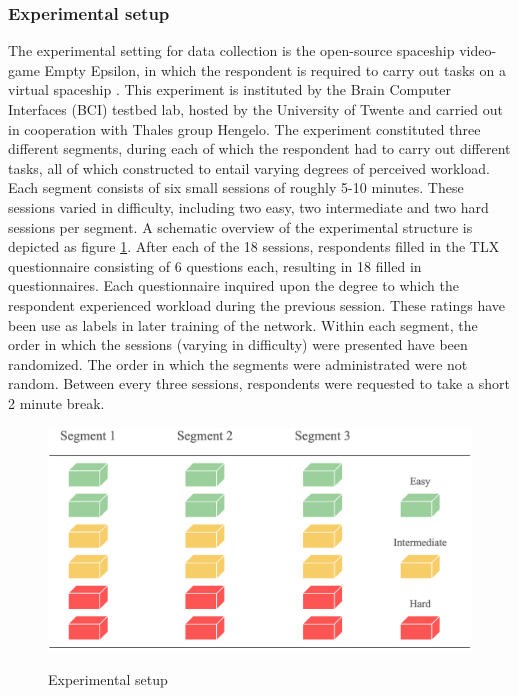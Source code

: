 \documentclass[12pt]{article}
\begin{document}
\subsubsection{Experimental setup}
The experimental setting for data collection is the open-source spaceship video-game Empty Epsilon, in which the respondent is required to carry out tasks on a virtual spaceship \cite{daid2016empty}. This experiment is instituted by the Brain Computer Interfaces (BCI) testbed lab, hosted by the University of Twente and carried out in cooperation with Thales group Hengelo. The experiment constituted three different segments, during each of which the respondent had to carry out different tasks, all of which constructed to entail varying degrees of perceived workload. Each segment consists of six small sessions of roughly 5-10 minutes. These sessions varied in difficulty, including two easy, two intermediate and two hard sessions per segment. A schematic overview of the experimental structure is depicted as figure \ref{fig:experimental}. After each of the 18 sessions, respondents filled in the TLX questionnaire consisting of 6 questions each, resulting in 18 filled in questionnaires. Each questionnaire inquired upon the degree to which the respondent experienced workload during the previous session. These ratings have been use as labels in later training of the network. Within each segment, the order in which the sessions (varying in difficulty) were presented have been randomized. The order in which the segments were administrated were not random. Between every three sessions, respondents were requested to take a short 2 minute break.

\begin{figure}
\caption{Experimental setup}
\bigskip
\includegraphics[scale=0.4]{experimental_setup}
\label{fig:experimental}
\end{figure}
\end{document}
